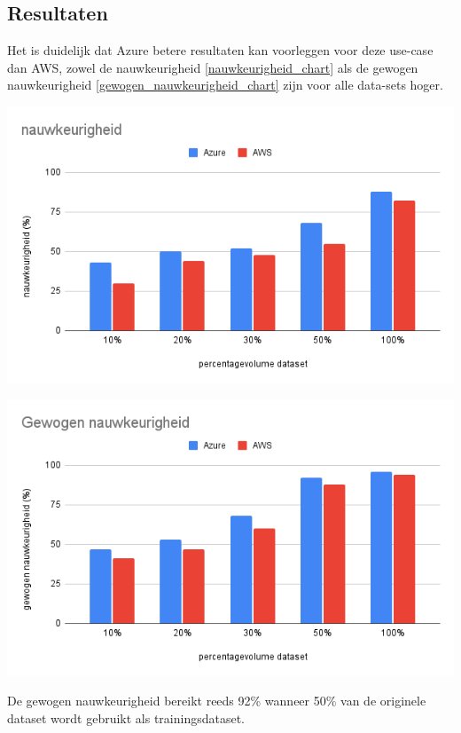 \documentclass[a0,portrait]{a0poster}
\begin{document}
\begin{multicols}{2}
\color{HoGentAccent1} 
\section*{Resultaten}
\color{black}
Het is duidelijk dat Azure betere resultaten kan voorleggen voor deze use-case dan AWS, zowel de nauwkeurigheid \ref{nauwkeurigheid_chart} als de gewogen nauwkeurigheid \ref{gewogen_nauwkeurigheid_chart} zijn voor alle data-sets hoger.  
\begin{center}\vspace{1cm}
    \includegraphics[width=1.0\linewidth]{nauwkeurigheid}
\end{center}\vspace{1cm}

\begin{center}\vspace{1cm}
    \includegraphics[width=1.0\linewidth]{Gewogen nauwkeurigheid}
\end{center}\vspace{1cm}
De gewogen nauwkeurigheid bereikt reeds 92\% wanneer 50\% van de originele dataset wordt gebruikt als trainingsdataset. 
\color{HoGentAccent1} 

\end{multicols}
\end{document}
